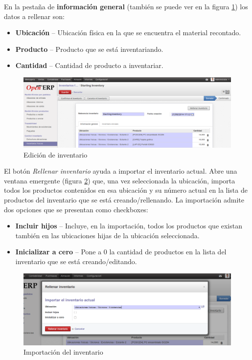 En la pestaña de \textbf{información general} (también se puede ver en la figura \ref{ub:inventarioindividual}) los datos a rellenar son:

\begin{itemize}
  \item \textbf{Ubicación} -- Ubicación física en la que se encuentra el material recontado.
  \item \textbf{Producto} -- Producto que se está inventariando.
  \item \textbf{Cantidad} -- Cantidad de producto a inventariar.
\end{itemize}

\begin{figure}[H]
\includegraphics[width=\textwidth]{almacen/img/inv_ind.png}
\caption{Edición de inventario}
\label{ub:inventarioindividual}
\end{figure}	

El botón \emph{Rellenar inventario} ayuda a importar el inventario actual. Abre una ventana emergente (figura \ref{ub:inventarioimportar}) que,
una vez seleccionada la ubicación, importa todos los productos contenidos en esa ubicación y su número actual en la lista de productos del inventario
que se está creando/rellenando. La importación admite dos opciones que se presentan como checkboxes:

\begin{itemize}
  \item \textbf{Incluir hijos} -- Incluye, en la importación, todos los productos que existan también en las ubicaciones hijas de la ubicación
                                  seleccionada.
  \item \textbf{Inicializar a cero} -- Pone a 0 la cantidad de productos en la lista del inventario que se está creando/editando.
\end{itemize}

\begin{figure}[H]
\includegraphics[width=\textwidth]{almacen/img/inv_imp.png}
\caption{Importación del inventario}
\label{ub:inventarioimportar}
\end{figure}


